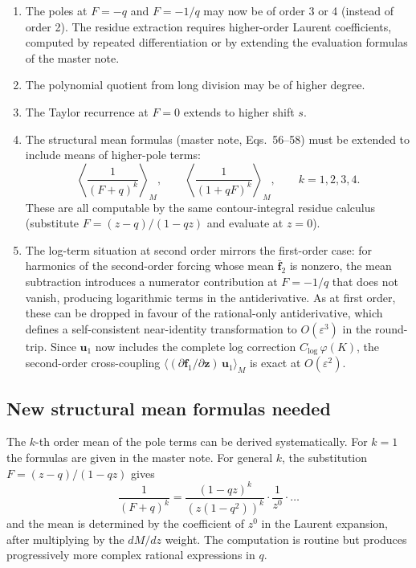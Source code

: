 \documentclass[11pt]{article}
\newcommand{\eps}{\varepsilon}
\begin{document}
\begin{enumerate}
\item The poles at $F = -q$ and $F = -1/q$ may now be of order 3 or 4
(instead of order 2). The residue extraction requires higher-order Laurent
coefficients, computed by repeated differentiation or by extending the
evaluation formulas of the master note.

\item The polynomial quotient from long division may be of higher degree.

\item The Taylor recurrence at $F = 0$ extends to higher shift $s$.

\item The structural mean formulas (master note, Eqs.~56--58) must be
extended to include means of higher-pole terms:
\begin{equation}
\left\langle \frac{1}{(F+q)^k} \right\rangle_M,
\qquad
\left\langle \frac{1}{(1+qF)^k} \right\rangle_M,
\qquad k = 1, 2, 3, 4.
\end{equation}
These are all computable by the same contour-integral residue calculus
(substitute $F = (z-q)/(1-qz)$ and evaluate at $z = 0$).

\item The log-term situation at second order mirrors the first-order case:
for harmonics of the second-order forcing whose mean $\bar{\bm f}_2$ is
nonzero, the mean subtraction introduces a numerator contribution at
$F = -1/q$ that does not vanish, producing logarithmic terms in the
antiderivative.  As at first order, these can be dropped in favour of
the rational-only antiderivative, which defines a self-consistent
near-identity transformation to $O(\eps^3)$ in the round-trip.
Since $\bm u_1$ now includes the complete log correction
$C_{\log}\,\varphi(K)$, the second-order cross-coupling
$\langle (\partial\bm f_1/\partial\bm z)\,\bm u_1 \rangle_M$
is exact at $O(\eps^2)$.
\end{enumerate}

\subsection{New structural mean formulas needed}

The $k$-th order mean of the pole terms can be derived systematically.
For $k = 1$ the formulas are given in the master note. For general $k$, the
substitution $F = (z-q)/(1-qz)$ gives
\begin{equation}
\frac{1}{(F+q)^k}
= \frac{(1-qz)^k}{(z(1-q^2))^k}
\cdot \frac{1}{z^0}
\cdot \ldots
\end{equation}
and the mean is determined by the coefficient of $z^0$ in the Laurent
expansion, after multiplying by the $dM/dz$ weight. The computation is
routine but produces progressively more complex rational expressions in $q$.
\end{document}
